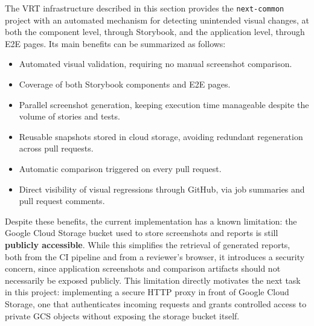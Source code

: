 The \ac{VRT} infrastructure described in this section provides the \texttt{next-common} project with an automated mechanism for detecting unintended visual changes, at both the component level, through Storybook, and the application level, through \ac{E2E} pages. Its main benefits can be summarized as follows:

\begin{itemize}
    \item Automated visual validation, requiring no manual screenshot comparison.
    \item Coverage of both Storybook components and \ac{E2E} pages.
    \item Parallel screenshot generation, keeping execution time manageable despite the volume of stories and tests.
    \item Reusable snapshots stored in cloud storage, avoiding redundant regeneration across pull requests.
    \item Automatic comparison triggered on every pull request.
    \item Direct visibility of visual regressions through GitHub, via job summaries and pull request comments.
\end{itemize}

Despite these benefits, the current implementation has a known limitation: the Google Cloud Storage bucket used to store screenshots and reports is still \textbf{publicly accessible}. While this simplifies the retrieval of generated reports, both from the \ac{CI} pipeline and from a reviewer's browser, it introduces a security concern, since application screenshots and comparison artifacts should not necessarily be exposed publicly. This limitation directly motivates the next task in this project: implementing a secure \ac{HTTP} proxy in front of Google Cloud Storage, one that authenticates incoming requests and grants controlled access to private \ac{GCS} objects without exposing the storage bucket itself.

\clearpage
